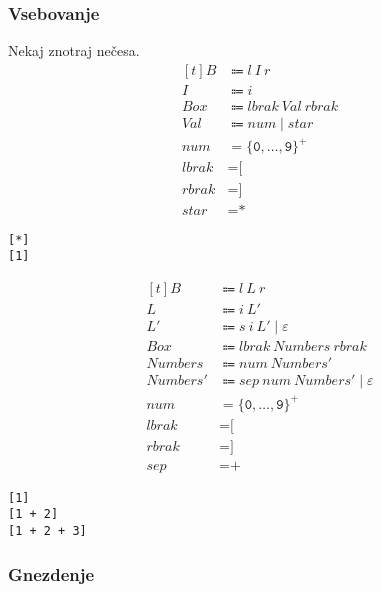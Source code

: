 \documentclass{report}
\newcommand{\Null}{\varepsilon}
\newcommand{\Char}[1]{\texttt{#1}}
\newcommand{\Spc}{\ }
\newcommand{\Union}{\mathrel{|}}
\newcommand{\KleenePlus}[1]{#1^+}
\newcommand{\Arrow}{\Coloneq}
\newcommand{\NT}[1]{{#1}}
\newcommand{\T}[1]{{#1}}
\begin{document}
\subsubsection{Vsebovanje}
Nekaj znotraj nečesa.
\begin{equation*}
  \begin{aligned}[t]
    \NT{B} &\Arrow \T{l} \Spc \T{I} \Spc \T{r}\\
    \NT{I} &\Arrow \T{i}\\[1em]
    \NT{Box} &\Arrow \T{lbrak} \Spc \NT{Val} \Spc \T{rbrak}\\
    \NT{Val} &\Arrow \T{num} \Union \T{star}\\[1em]
    \T{num} &= \KleenePlus{\{\Char{0}, \dots, \Char{9}\}}\\
    \T{lbrak} &= \Char{[}\\
    \T{rbrak} &= \Char{]}\\
    \T{star} &= \Char{*}
  \end{aligned}
\end{equation*}
\begin{lstlisting}
[*]
[1]
\end{lstlisting}

\begin{equation*}
  \begin{aligned}[t]
    \NT{B} &\Arrow \T{l} \Spc \T{L} \Spc \T{r}\\
    \NT{L} &\Arrow \T{i} \Spc \NT{L'}\\
    \NT{L'} &\Arrow \T{s} \Spc \T{i} \Spc \NT{L'} \Union \Null\\[1em]
    \NT{Box} &\Arrow \T{lbrak} \Spc \NT{Numbers} \Spc \T{rbrak}\\
    \NT{Numbers} &\Arrow \T{num} \Spc \NT{Numbers'}\\
    \NT{Numbers'} &\Arrow \T{sep} \Spc \T{num} \Spc \NT{Numbers'} \Union \Null\\[1em]
    \T{num} &= \KleenePlus{\{\Char{0}, \dots, \Char{9}\}}\\
    \T{lbrak} &= \Char{[}\\
    \T{rbrak} &= \Char{]}\\
    \T{sep} &= \Char{+}
  \end{aligned}
\end{equation*}
\begin{lstlisting}
[1]
[1 + 2]
[1 + 2 + 3]
\end{lstlisting}

\subsubsection{Gnezdenje}
\end{document}

